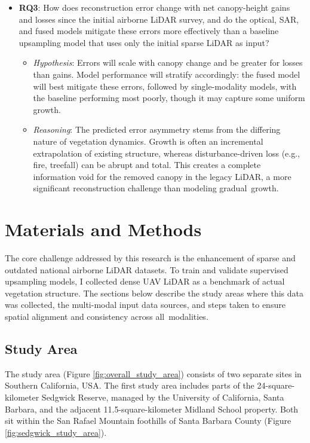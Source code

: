 \documentclass[12pt]{report}
\begin{document}
\begin{itemize}
  \item \textbf{RQ3}: How does reconstruction error change with net canopy-height gains and losses since the initial airborne LiDAR survey, and do the optical, SAR, and fused models mitigate these errors more effectively than a baseline upsampling model that uses only the initial sparse LiDAR as input?
        \begin{itemize}
            \item \textit{Hypothesis}: Errors will scale with canopy change and be greater for losses than gains. Model performance will stratify accordingly: the fused model will best mitigate these errors, followed by single-modality models, with the baseline performing most poorly, though it may capture some uniform growth.
            \item \textit{Reasoning}: The predicted error asymmetry stems from the differing nature of vegetation dynamics. Growth is often an incremental extrapolation of existing structure, whereas disturbance-driven loss (e.g., fire, treefall) can be abrupt and total. This creates a complete information void for the removed canopy in the legacy LiDAR, a more significant reconstruction challenge than modeling \mbox{gradual growth}.
        \end{itemize}
\end{itemize}





\chapter{Materials and Methods}
\chapterstart

The core challenge addressed by this research is the enhancement of sparse and outdated national airborne LiDAR datasets. To train and validate supervised upsampling models, I collected dense UAV LiDAR as a benchmark of actual vegetation structure. The sections below describe the study areas where this data was collected, the multi-modal input data sources, and steps taken to ensure spatial alignment and consistency across \mbox{all modalities}.


\section{Study Area}


The study area (Figure \ref{fig:overall_study_area}) consists of two separate sites in Southern California, USA. The first study area includes parts of the 24-square-kilometer Sedgwick Reserve, managed by the University of California, Santa Barbara, and the adjacent 11.5-square-kilometer Midland School property. Both sit within the San Rafael Mountain foothills of Santa Barbara County (Figure \ref{fig:sedgwick_study_area}).
\end{document}
